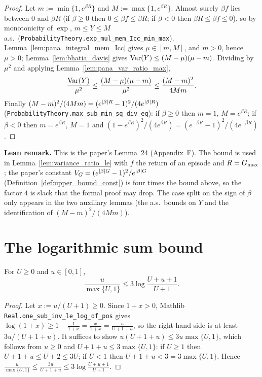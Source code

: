 \begin{proof}
\leanok
Let $m := \min\{1, e^{\beta R}\}$ and $M := \max\{1, e^{\beta R}\}$.
Almost surely $\beta f$ lies between $0$ and $\beta R$ (if $\beta \ge 0$ then
$0 \le \beta f \le \beta R$; if $\beta < 0$ then $\beta R \le \beta f \le 0$), so by
monotonicity of $\exp$, $m \le Y \le M$ a.s.\ (\texttt{ProbabilityTheory.exp\_mul\_mem\_Icc\_min\_max}).
Lemma~\ref{lem:pana_integral_mem_Icc} gives
$\mu \in [m, M]$, and $m > 0$, hence $\mu > 0$; Lemma~\ref{lem:bhatia_davis} gives
$\operatorname{Var}(Y) \le (M - \mu)(\mu - m)$.
Dividing by $\mu^2$ and applying Lemma~\ref{lem:pana_var_ratio_max},
\[
  \frac{\operatorname{Var}(Y)}{\mu^2} \le \frac{(M - \mu)(\mu - m)}{\mu^2} \le \frac{(M - m)^2}{4Mm} .
\]
Finally $(M - m)^2/(4Mm) = (e^{\lvert \beta \rvert R} - 1)^2/(4e^{\lvert \beta \rvert R})$
(\texttt{ProbabilityTheory.max\_sub\_min\_sq\_div\_eq}): if $\beta \ge 0$ then $m = 1$,
$M = e^{\beta R}$; if $\beta < 0$ then $m = e^{\beta R}$, $M = 1$ and
$(1 - e^{\beta R})^2/(4e^{\beta R}) = (e^{-\beta R} - 1)^2/(4e^{-\beta R})$.
\end{proof}

\textbf{Lean remark.} This is the paper's Lemma~24 (Appendix~F). The bound is used in
Lemma~\ref{lem:variance_ratio_le} with $f$ the return of an episode and $R = G_{\max}$; the
paper's constant $V_G = (e^{\lvert \beta \rvert G} - 1)^2/e^{\lvert \beta \rvert G}$ (Definition~\ref{def:upper_bound_const})
is four times the bound above, so the factor $4$ is slack that the formal proof may drop.
The case split on the sign of $\beta$ only appears in the two auxiliary lemmas (the a.s.\ bounds
on $Y$ and the identification of $(M - m)^2/(4Mm)$).

\section{The logarithmic sum bound}
\label{sec:pre_analysis_log_sum}

\begin{lemma}\label{lem:pana_log_sum_step}
\leanok
For $U \ge 0$ and $u \in [0, 1]$,
\[
  \frac{u}{\max\{U, 1\}} \le 3\log\frac{U + u + 1}{U + 1} .
\]
\end{lemma}

\begin{proof}
\leanok
Let $x := u/(U + 1) \ge 0$. Since $1 + x > 0$, Mathlib \texttt{Real.one\_sub\_inv\_le\_log\_of\_pos}
gives $\log(1 + x) \ge 1 - \frac{1}{1 + x} = \frac{x}{1 + x} = \frac{u}{U + 1 + u}$, so the
right-hand side is at least $3u/(U + 1 + u)$. It
suffices to show $u(U + 1 + u) \le 3u\max\{U, 1\}$, which follows from $u \ge 0$ and
$U + 1 + u \le 3\max\{U, 1\}$: if $U \ge 1$ then
$U + 1 + u \le U + 2 \le 3U$; if $U < 1$ then $U + 1 + u < 3 = 3\max\{U, 1\}$. Hence
$\frac{u}{\max\{U,1\}} \le \frac{3u}{U + 1 + u} \le 3\log\frac{U + u + 1}{U + 1}$.
\end{proof}


